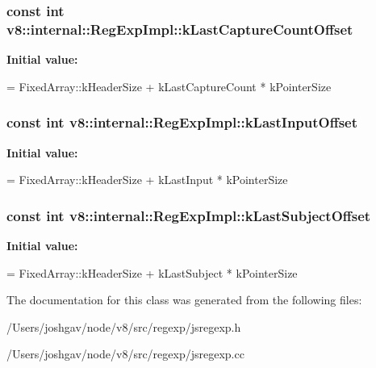 \subsubsection[{\texorpdfstring{k\+Last\+Capture\+Count\+Offset}{kLastCaptureCountOffset}}]{\setlength{\rightskip}{0pt plus 5cm}const int v8\+::internal\+::\+Reg\+Exp\+Impl\+::k\+Last\+Capture\+Count\+Offset\hspace{0.3cm}{\ttfamily [static]}}\hypertarget{classv8_1_1internal_1_1_reg_exp_impl_a00a7b8279f52b16139ad7ec4434a779c}{}\label{classv8_1_1internal_1_1_reg_exp_impl_a00a7b8279f52b16139ad7ec4434a779c}
{\bfseries Initial value\+:}
\begin{DoxyCode}
=
      FixedArray::kHeaderSize + kLastCaptureCount * kPointerSize
\end{DoxyCode}
\subsubsection[{\texorpdfstring{k\+Last\+Input\+Offset}{kLastInputOffset}}]{\setlength{\rightskip}{0pt plus 5cm}const int v8\+::internal\+::\+Reg\+Exp\+Impl\+::k\+Last\+Input\+Offset\hspace{0.3cm}{\ttfamily [static]}}\hypertarget{classv8_1_1internal_1_1_reg_exp_impl_a64f715e3ff891b06206c35ce658800e8}{}\label{classv8_1_1internal_1_1_reg_exp_impl_a64f715e3ff891b06206c35ce658800e8}
{\bfseries Initial value\+:}
\begin{DoxyCode}
=
      FixedArray::kHeaderSize + kLastInput * kPointerSize
\end{DoxyCode}
\subsubsection[{\texorpdfstring{k\+Last\+Subject\+Offset}{kLastSubjectOffset}}]{\setlength{\rightskip}{0pt plus 5cm}const int v8\+::internal\+::\+Reg\+Exp\+Impl\+::k\+Last\+Subject\+Offset\hspace{0.3cm}{\ttfamily [static]}}\hypertarget{classv8_1_1internal_1_1_reg_exp_impl_a43777bf0219877ec08e0076083c37b08}{}\label{classv8_1_1internal_1_1_reg_exp_impl_a43777bf0219877ec08e0076083c37b08}
{\bfseries Initial value\+:}
\begin{DoxyCode}
=
      FixedArray::kHeaderSize + kLastSubject * kPointerSize
\end{DoxyCode}


The documentation for this class was generated from the following files\+:\begin{DoxyCompactItemize}
\item 
/\+Users/joshgav/node/v8/src/regexp/jsregexp.\+h\item 
/\+Users/joshgav/node/v8/src/regexp/jsregexp.\+cc\end{DoxyCompactItemize}
